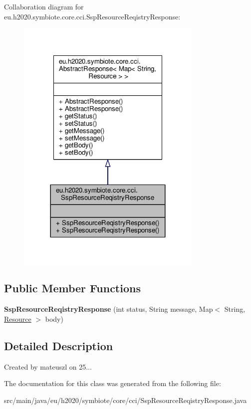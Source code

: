 Collaboration diagram for eu.\+h2020.\+symbiote.\+core.\+cci.\+Ssp\+Resource\+Reqistry\+Response\+:\nopagebreak
\begin{figure}[H]
\begin{center}
\leavevmode
\includegraphics[width=252pt]{classeu_1_1h2020_1_1symbiote_1_1core_1_1cci_1_1SspResourceReqistryResponse__coll__graph}
\end{center}
\end{figure}
\subsection*{Public Member Functions}
\begin{DoxyCompactItemize}
\item 
\mbox{\label{classeu_1_1h2020_1_1symbiote_1_1core_1_1cci_1_1SspResourceReqistryResponse_a4f06b4373c0c8ff34fc567f2e1d1455f}} 
{\bfseries Ssp\+Resource\+Reqistry\+Response} (int status, String message, Map$<$ String, \hyperlink{classeu_1_1h2020_1_1symbiote_1_1model_1_1cim_1_1Resource}{Resource} $>$ body)
\end{DoxyCompactItemize}


\subsection{Detailed Description}
Created by mateuszl on 25... 

The documentation for this class was generated from the following file\+:\begin{DoxyCompactItemize}
\item 
src/main/java/eu/h2020/symbiote/core/cci/Ssp\+Resource\+Reqistry\+Response.\+java\end{DoxyCompactItemize}
